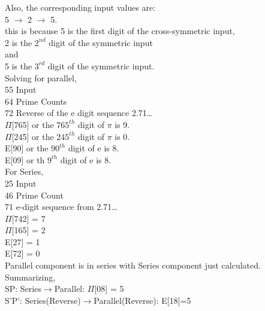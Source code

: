 Also, the corresponding input values are: \\

5 $\rightarrow$ 2 $\rightarrow$ 5.\\

this is because 5 is the first digit of the cross-symmetric input, \\
2 is the $2^{nd}$ digit of the symmetric input\\
and \\
5 is the $3^{rd}$ digit of the symmetric input.\\

Solving for parallel,\\

55 {Input}\\
64 {Prime Counts}\\
72  {Reverse of the e digit sequence 2.71\ldots }\\

$\Pi$[765] or the $765^{th}$ digit of $\pi$ is 9.\\
$\Pi$[245] or the $245^{th}$ digit of $\pi$ is 0.\\

E[90] or the $90^{th}$ digit of e is 8.\\
E[09] or th $9^{th}$ digit of e is 8.\\

For Series,\\
25 {Input}\\
46 {Prime Count}\\
71 {e-digit sequence from 2.71\ldots }\\

$\Pi$[742] = 7\\
$\Pi$[165] = 2\\
E[27] = 1\\
E[72] = 0\\

Parallel component is in series with Series component just calculated.\\

Summarizing,\\

SP: Series$\rightarrow$Parallel: $\Pi$[08] = 5\\
S'P': Series(Reverse)$\rightarrow$Parallel(Reverse): E[18]=5 \\

